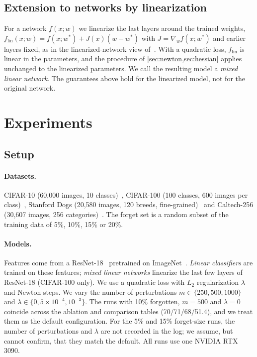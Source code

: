 \documentclass[10pt,twocolumn,letterpaper]{article}
\begin{document}
\subsection{Extension to networks by linearization}
\label{sec:deep}
For a network $f(x;w)$ we linearize the last layers around the trained weights, $f_{\mathrm{lin}}(x;w)=f(x;w^*)+J(x)(w-w^*)$ with $J=\nabla_w f(x;w^*)$ and earlier layers fixed, as in the linearized-network view of~\cite{golatkar2021mixed,jacot2018,lee2019wide}.
With a quadratic loss, $f_{\mathrm{lin}}$ is linear in the parameters, and the procedure of \cref{sec:newton,sec:hessian} applies unchanged to the linearized parameters.
We call the resulting model a \emph{mixed linear network}.
The guarantees above hold for the linearized model, not for the original network.

\section{Experiments}
\label{sec:experiments}
\subsection{Setup}
\label{sec:setup}
\paragraph{Datasets.}
CIFAR-10 (60,000 images, 10 classes)~\cite{krizhevsky2009}, CIFAR-100 (100 classes, 600 images per class)~\cite{krizhevsky2009}, Stanford Dogs (20,580 images, 120 breeds, fine-grained)~\cite{khosla2011} and Caltech-256 (30,607 images, 256 categories)~\cite{griffin2007}.
The forget set is a random subset of the training data of 5\%, 10\%, 15\% or 20\%.

\paragraph{Models.}
Features come from a ResNet-18~\cite{he2016} pretrained on ImageNet~\cite{deng2009}.
\emph{Linear classifiers} are trained on these features; \emph{mixed linear networks} linearize the last few layers of ResNet-18 (CIFAR-100 only).
We use a quadratic loss with $L_2$ regularization $\lambda$ and Newton steps.
We vary the number of perturbations $m\in\{250,500,1000\}$ and $\lambda\in\{0,5\times10^{-4},10^{-3}\}$.
The runs with 10\% forgotten, $m=500$ and $\lambda=0$ coincide across the ablation and comparison tables (70/71/68/51.4), and we treat them as the default configuration. For the 5\% and 15\% forget-size runs, the number of perturbations and $\lambda$ are not recorded in the log; we assume, but cannot confirm, that they match the default.
All runs use one NVIDIA RTX 3090.
\end{document}
